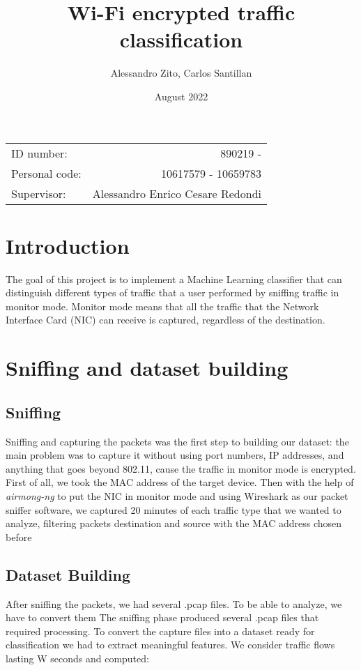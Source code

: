 \documentclass[11pt, USenglish]{article}
\title{Wi-Fi encrypted traffic classification}
\author{Alessandro Zito, Carlos Santillan}
\date{August 2022}
\begin{document}
\maketitle
\begin{center}
\begin{tabular}{l r}
ID number: & 890219 - \\ %
Personal code: & 10617579 - 10659783\\
Supervisor: & Alessandro Enrico Cesare Redondi %
\end{tabular}
\end{center}


\newpage

\tableofcontents

\newpage


\section{Introduction}
The goal of this project is to implement a Machine Learning classifier that can distinguish different types of traffic that a user performed by sniffing traffic in monitor mode. Monitor mode means that all the traffic that the Network Interface Card (NIC) can receive is captured, regardless of the destination.

\section{Sniffing and dataset building}

\subsection{Sniffing}
Sniffing and capturing the packets was the first step to building our dataset: the main problem was to
capture it without using port numbers, IP addresses, and anything that goes beyond 802.11, cause
the traffic in monitor mode is encrypted. First of all, we took the MAC address of the target device.
Then with the help of \textit{airmong-ng} \cite{airmonng} to put the NIC in monitor mode and using Wireshark as our packet sniffer software, we captured 20 minutes of each traffic type that we wanted to analyze, filtering packets destination and source with the MAC address chosen before

\subsection{Dataset Building}
After sniffing the packets, we had several .pcap files. To be able to analyze, we have to
convert them The sniffing phase produced several .pcap files that required processing. To convert
the capture files into a dataset ready for classification we had to extract meaningful features. We
consider traffic flows lasting W seconds and computed:
\end{document}
